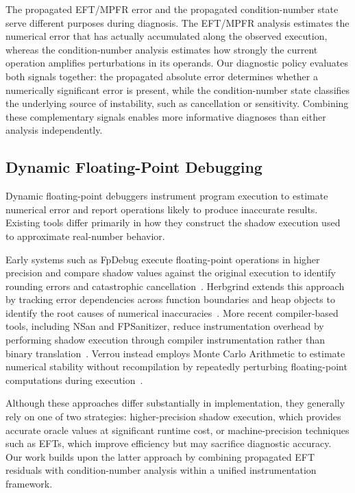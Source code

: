 The propagated EFT/MPFR error and the propagated condition-number state serve different purposes during diagnosis. The EFT/MPFR analysis estimates the numerical error that has actually accumulated along the observed execution, whereas the condition-number analysis estimates how strongly the current operation amplifies perturbations in its operands. Our diagnostic policy evaluates both signals together: the propagated absolute error determines whether a numerically significant error is present, while the condition-number state classifies the underlying source of instability, such as cancellation or sensitivity. Combining these complementary signals enables more informative diagnoses than either analysis independently.

\subsection{Dynamic Floating-Point Debugging}
\label{sec:back_debugging}

Dynamic floating-point debuggers instrument program execution to estimate numerical error and report operations likely to produce inaccurate results. Existing tools differ primarily in how they construct the shadow execution used to approximate real-number behavior.

Early systems such as FpDebug execute floating-point operations in higher precision and compare shadow values against the original execution to identify rounding errors and catastrophic cancellation~\cite{fpdebug}. Herbgrind extends this approach by tracking error dependencies across function boundaries and heap objects to identify the root causes of numerical inaccuracies~\cite{herbgrind}. More recent compiler-based tools, including NSan and FPSanitizer, reduce instrumentation overhead by performing shadow execution through compiler instrumentation rather than binary translation~\cite{nsan, fpsanitizer}. Verrou instead employs Monte Carlo Arithmetic to estimate numerical stability without recompilation by repeatedly perturbing floating-point computations during execution~\cite{verrou}.

Although these approaches differ substantially in implementation, they generally rely on one of two strategies: higher-precision shadow execution, which provides accurate oracle values at significant runtime cost, or machine-precision techniques such as EFTs, which improve efficiency but may sacrifice diagnostic accuracy. Our work builds upon the latter approach by combining propagated EFT residuals with condition-number analysis within a unified instrumentation framework.
